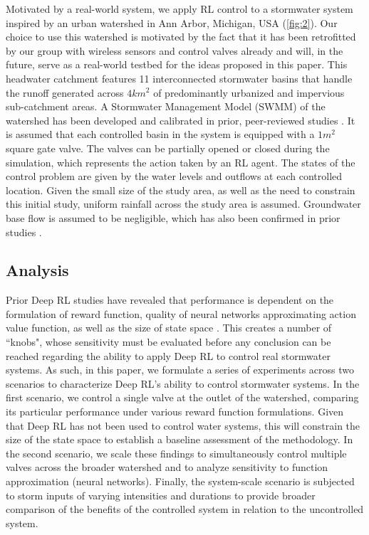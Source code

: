Motivated by a real-world system, we apply RL control to a stormwater system inspired by an urban watershed in Ann Arbor, Michigan, USA (\ref{fig:2}). Our choice to use this watershed is motivated by the fact that it has been retrofitted by our group with wireless sensors and control valves already \cite{bartos2017open} and will, in the future, serve as a real-world testbed for the ideas proposed in this paper. This headwater catchment features 11 interconnected stormwater basins that handle the runoff generated across $4km^2$   of predominantly urbanized and impervious sub-catchment areas.   A Stormwater Management Model (SWMM) of the watershed has been developed and calibrated in prior, peer-reviewed studies \cite{wong2018real}. It is assumed that each controlled basin in the system is equipped with a $1m^2$ square gate valve. The valves can be partially opened or closed during the simulation, which represents the action taken by an RL agent. The states of the control problem are given by the water levels and outflows at each controlled location. Given the small size of the study area, as well as the need to constrain this initial study, uniform rainfall across the study area is assumed. Groundwater base flow is assumed to be negligible, which has also been confirmed in prior studies \cite{wong2018real}.

\subsection{\textbf{Analysis}}
Prior Deep RL studies have revealed that performance is dependent on the formulation of reward function, quality of neural networks approximating action value function, as well as the size of state space \cite{Sutton98, henderson2017Deep}.
This creates a number of ``knobs", whose sensitivity must be evaluated before any conclusion can be reached regarding the ability to apply Deep RL to control real stormwater systems.
As such, in this paper, we formulate a series of experiments across two scenarios to characterize Deep RL’s ability to control stormwater systems.
In the first scenario, we control a single valve at the outlet of the watershed, comparing its particular performance under various reward function formulations.
Given that Deep RL has not been used to control water systems, this will constrain the size of the state space to establish a baseline assessment of the methodology.
In the second scenario, we scale these findings to simultaneously control multiple valves across the broader watershed and to analyze  sensitivity to function approximation (neural networks). Finally, the system-scale scenario is subjected to storm inputs of varying intensities and durations to provide broader comparison of the benefits of the controlled system in relation to the uncontrolled system.

